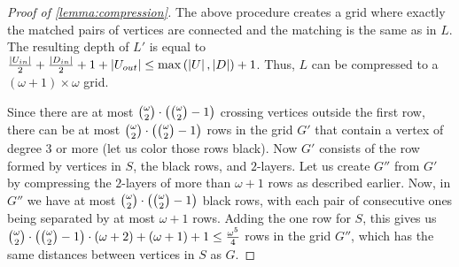 \begin{proof}[Proof of \cref{lemma:compression}]
    The above procedure creates a grid where exactly the matched pairs of vertices are connected and the matching is the same as in $L$.
    The resulting depth of $L'$ is equal to
    $\frac{\left| U_{in} \right|}{2} + \frac{\left| D_{in} \right|}{2} + 1 + \left| U_{out} \right|
    \leq \max \left(  \left| U \right|, \left| D \right| \right) + 1$.
    Thus, $L$ can be compressed to a $(\omega+1) \times \omega$ grid.
        
    Since there are at most ${\omega \choose 2} \cdot \left( {\omega \choose 2} - 1 \right)$ crossing vertices outside the first row,
    there can be at most ${\omega \choose 2} \cdot \left( {\omega \choose 2} - 1 \right)$ rows in the grid $G'$ that contain a vertex
    of degree $3$ or more (let us color those rows black).
    Now $G'$ consists of the row formed by vertices in $S$, the black rows, and $2$-layers.
    Let us create $G''$ from $G'$ by compressing the $2$-layers of more than $\omega + 1$ rows as described earlier.
    Now, in $G''$ we have at most ${\omega \choose 2} \cdot \left( {\omega \choose 2} - 1 \right)$ black rows,
    with each pair of consecutive ones being separated by at most $\omega+1$ rows.
    Adding the one row for $S$, this gives us
    ${\omega \choose 2} \cdot \left( {\omega \choose 2} - 1 \right) \cdot (\omega+2) + (\omega + 1) + 1 \leq \frac{\omega^5}{4}$
    rows in the grid $G''$,
    which has the same distances between vertices in $S$ as $G$.
    \end{proof}